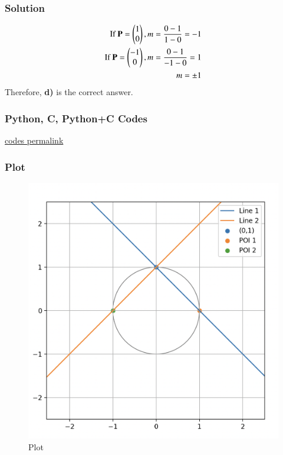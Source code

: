 \documentclass{beamer}
\begin{document}
\begin{frame}[fragile]
    \frametitle{Solution}
\begin{align}
\text{If } \mathbf{P} = \begin{pmatrix}1\\0\end{pmatrix}, m = \frac{0-1}{1-0} = -1   \\
\text{If } \mathbf{P} = \begin{pmatrix}-1\\0\end{pmatrix}, m = \frac{0-1}{-1-0} = 1 \\
m = \pm1
\end{align}
Therefore, \textbf{d)} is the correct answer.
\end{frame}

\begin{frame}[fragile]
    \frametitle{Python, C, Python+C Codes}

\href{https://github.com/AdityaAppana/ee1030-2025/tree/67c35d20c81e9b8d36b9eddc6f9cb710d1aedc9a/ee25btech11004/matgeo/7.4.11/Codes}{codes permalink}

\end{frame}

\begin{frame}
\frametitle{Plot}
\begin{figure}[H]
    \centering
    \includegraphics[width=0.6\columnwidth]{Figs/7411.png}
    \caption{Plot}
    \label{fig:placeholder}
\end{figure}

\end{frame}
\end{document}
